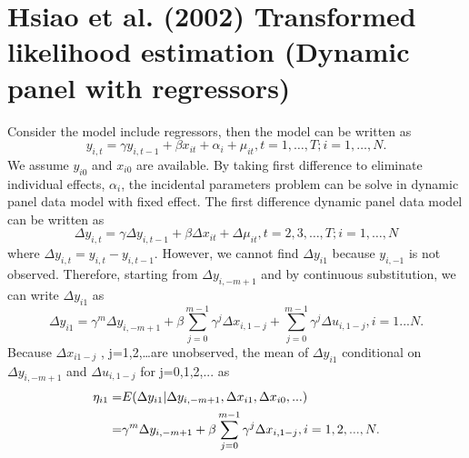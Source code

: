 \documentclass[12pt,a4paper,hyperref]{article}
\begin{document}
\section{Hsiao et al. (2002) Transformed likelihood estimation (Dynamic panel with regressors)  }
Consider the model include regressors, then the model can be written as
\begin{equation}
y_{i,t}=\gamma y_{i,t-1}+\beta  x_{it}+ \alpha_{i} + \mu_{it} , t=1,\ldots,T; i=1,\ldots, N.
\end{equation}
We assume $y_{i0}$ and $x_{i0}$ are available.
 By taking first difference to eliminate individual effects, $\alpha_{i}$, the incidental parameters problem can be solve in dynamic panel data model with fixed effect. The first difference dynamic panel data model can be written as
\begin{equation}
\Delta y_{i,t}=\gamma \Delta y_{i,t-1}+ \beta \Delta x_{it}+\Delta \mu_{it} , t=2,3,\ldots ,T; i=1,\ldots, N
\end{equation}
where $\Delta y_{i,t}= y_{i,t}-y_{i,t-1}$.
However, we cannot find $\Delta y_{i1} $ because $ y_{i,-1} $ is not observed. Therefore, starting from $\Delta y_{i,-m+1}$ and by continuous substitution, we can write $\Delta y_{i1} $ as
\begin{equation}
\Delta y_{i1}=\gamma^{m}\Delta y_{i,-m+1}+\beta \sum_{j=0}^{m-1}{\gamma^{j}\Delta x_{i,1-j}}+\sum_{j=0}^{m-1}{\gamma^{j}\Delta u_{i,1-j}} , i=1...N.
\end{equation}
Because $\Delta x_{i1-j}$ , j=1,2,\ldots are unobserved, the mean of $\Delta y_{i1}$
conditional on $\Delta y_{i,-m+1}$ and $\Delta u_{i,1-j}$ for j=0,1,2,... as
\begin{align}
\eta_{i1}=& E(\Delta y_{i1}|\Delta y_{i,-m+1},\Delta x_{i1}, \Delta x_{i0},...) \\
=& \gamma^{m}\Delta y_{i,-m+1}+\beta \sum_{j=0}^{m-1}{\gamma^{j}\Delta x_{i,1-j}} , i=1,2,...,N. \notag
\end{align}
\end{document}
